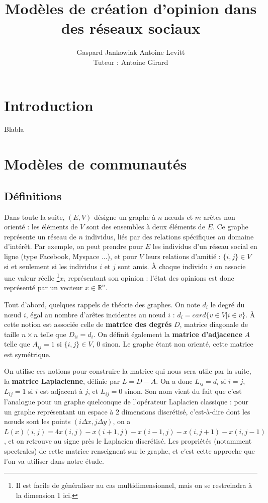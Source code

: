 \documentclass[12pt]{article}
\newcommand{\R}{\mathbb{R}}
\begin{document}
\author{Gaspard Jankowiak \quad Antoine Levitt\\ Tuteur : Antoine Girard}
\title{Modèles de création d'opinion dans des réseaux sociaux}
\maketitle
{}
\tableofcontents
\newpage


\section{Introduction}
Blabla


\section{Modèles de communautés}
\subsection{Définitions}
Dans toute la suite, $(E, V)$ désigne un graphe à $n$ n\oe uds et $m$
arêtes non orienté : les éléments de $V$ sont des ensembles à deux
éléments de $E$. Ce graphe représente un réseau de $n$ individus, liés
par des relations spécifiques au domaine d'intérêt. Par exemple, on
peut prendre pour $E$ les individus d'un réseau social en ligne (type
Facebook, Myspace ...), et pour $V$ leurs relations d'amitié : $\{i,
j\} \in V$ si et seulement si les individus $i$ et $j$ sont amis. À
chaque individu $i$ on associe une valeur réelle \footnote{Il est facile
de généraliser au cas multidimensionnel, mais on se restreindra à la
dimension 1 ici.}$x_i$ représentant son opinion : l'état des opinions est
donc représenté par un vecteur $x \in \R^n$.

Tout d'abord, quelques rappels de théorie des graphes. On note $d_i$
le degré du n\oe ud $i$, égal au nombre d'arêtes incidentes au n\oe ud
$i$ : $d_i = card \{v \in V | i \in v\}$. À cette notion est
associée celle de {\bf matrice des degrés} $D$, matrice diagonale
de taille $n \times n$ telle que $D_{i i} = d_i$. On définit
également la {\bf matrice d'adjacence} $A$ telle que $A_{i j} = 1$
si $\{i, j\} \in V$, $0$ sinon. Le graphe étant non orienté, cette
matrice est symétrique.

On utilise ces notions pour construire la matrice qui nous sera
utile par la suite, la {\bf matrice Laplacienne}, définie par $L
= D - A$. On a donc $L_{i j} = d_i$ si $i = j$, $L_{i j} = 1$ si
$i$ est adjacent à $j$, et $L_{i j} = 0$ sinon. Son nom vient du
fait que c'est l'analogue pour un graphe quelconque de
l'opérateur Laplacien classique : pour un graphe représentant un
espace à $2$ dimensions discrétisé, c'est-à-dire dont les n\oe uds
sont les points $(i \Delta x, j \Delta y)$, on a $L(x) (i, j) =
4 x(i, j) - x(i+1, j) - x(i-1, j) - x(i, j+1) - x(i, j-1)$, et
on retrouve au signe près le Laplacien discrétisé. Les
propriétés (notamment spectrales) de cette matrice renseignent
sur le graphe, et c'est cette approche que l'on va utiliser dans
notre étude.
\end{document}
